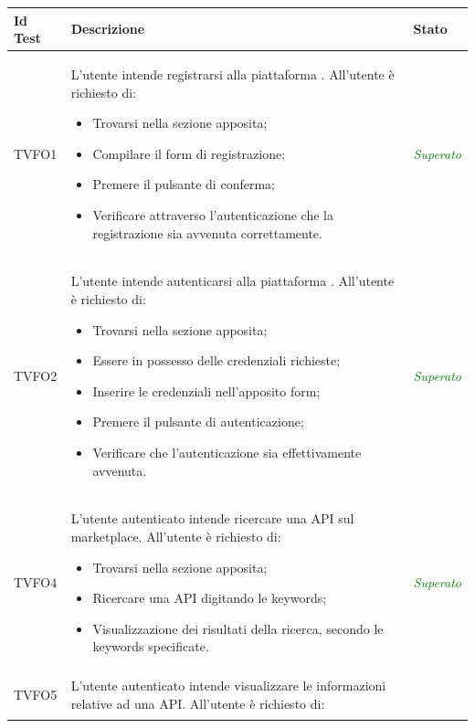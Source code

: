 	\normalsize
	\begin{longtable}{|>{\centering\arraybackslash}p{2.3cm}|>{\centering\arraybackslash}p{7.5cm} | >{\centering\arraybackslash}p{4cm}|}
		\hline \rowcolor{Gray}
		\textbf{Id Test} & \textbf{Descrizione} & \textbf{Stato}\\
		\hline
		\endhead
		\hypertarget{TVFO1}{TVFO1} & L’utente intende registrarsi alla piattaforma \progetto. All’utente è richiesto di:
		\begin{itemize}
			\item Trovarsi nella sezione apposita;
			\item Compilare il form di registrazione;
			\item Premere il pulsante di conferma;
			\item Verificare attraverso l’autenticazione che la registrazione sia avvenuta correttamente.
		\end{itemize}
		& \textcolor{Green}{\textit{Superato}}\\ \hline
		\hypertarget{TVFO2}{TVFO2} & L’utente intende autenticarsi alla piattaforma \progetto. All’utente è richiesto di:
		\begin{itemize}
			\item Trovarsi nella sezione apposita;
			\item Essere in possesso delle credenziali richieste;
			\item Inserire le credenziali nell’apposito form;
			\item Premere il pulsante di autenticazione;
			\item Verificare che l’autenticazione sia effettivamente avvenuta.
		\end{itemize}
		& \textcolor{Green}{\textit{Superato}}\\ \hline
		\hypertarget{TVFO4}{TVFO4} & L’utente autenticato  intende ricercare una API sul marketplace. All’utente è richiesto di:
		\begin{itemize}
			\item Trovarsi nella sezione apposita;
			\item Ricercare una API digitando le keywords;
			\item Visualizzazione dei risultati della ricerca, secondo le keywords specificate.
		\end{itemize} & \textcolor{Green}{\textit{Superato}}\\ \hline
		\hypertarget{TVFO5}{TVFO5} & L’utente autenticato  intende visualizzare le informazioni relative ad una API. All’utente è richiesto di:

\end{longtable}
